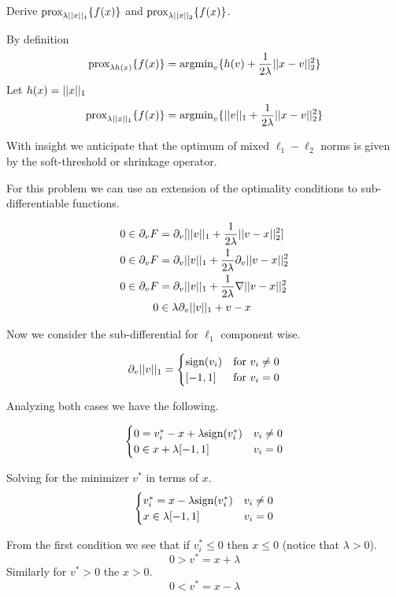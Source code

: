 \documentclass[11pt, answers]{exam}
\begin{document}
\begin{questions}

	\question Derive $\text{prox}_{\lambda|| x ||_1}\{f(x)\}$ and $\text{prox}_{\lambda|| x ||_2}\{f(x)\}$.

	\begin{solution}

		By definition
		$$\text{prox}_{\lambda h(x)}\{f(x)\}=\text{argmin}_v\{h(v)+\frac{1}{2\lambda}|| x-v ||_2^2\}$$
		Let $h(x)=|| x ||_1$
		$$\text{prox}_{\lambda || x ||_1}\{f(x)\}=\text{argmin}_v\{|| v ||_1+\frac{1}{2\lambda}|| x-v ||_2^2\}$$

		With insight we anticipate that the optimum of mixed $\ell_1-\ell_2$ norms is given by the soft-threshold or shrinkage operator.

		For this problem we can use an extension of the optimality conditions to sub-differentiable functions.

		\begin{align*}
		0\in \partial_v F &= \partial_v [|| v ||_1 +\frac{1}{2\lambda}|| v-x ||_2^2]\\
		0\in \partial_v F &= \partial_v || v ||_1 +\frac{1}{2\lambda}\partial_v || v-x ||_2^2\\
		0\in \partial_v F &= \partial_v || v ||_1 +\frac{1}{2\lambda}\nabla || v-x ||_2^2\\
		0&\in  \lambda \partial_v || v ||_1 +v-x
		\end{align*}

		Now we consider the sub-differential for $\ell_1$ component wise.

		$$\partial_v || v ||_1 = \begin{cases} \text{sign}(v_i) &\text{for }v_i\neq 0 \\
				[-1,1] & \text{for } v_i=0\end{cases}$$

		Analyzing both cases we have the following.

		$$\begin{cases}0=v_i^*-x+\lambda\text{sign}(v_i^*) & v_i\neq 0\\
			0\in x+\lambda[-1,1] & v_i= 0
		\end{cases}$$

		Solving for the minimizer $v^*$ in terms of $x$.
		$$\begin{cases}v_i^*=x-\lambda\text{sign}(v_i^*) & v_i\neq 0\\
			x\in\lambda[-1,1] & v_i= 0
		\end{cases}$$

		From the first condition we see that if $v_i^*\leq 0$ then $x\leq 0$ (notice that $\lambda>0$).
		$$0>v^* = x+\lambda$$
		Similarly for $v^*>0$ the $x>0$.
		$$0<v^* = x-\lambda$$


\end{solution}
\end{questions}
\end{document}

